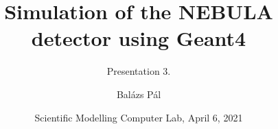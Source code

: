\title[Geant4]
{Simulation of the NEBULA detector using Geant4}

\subtitle{Presentation 3.}

\author[Balázs Pál]
{Balázs Pál}


\date[ELTE 2021]
{Scientific Modelling Computer Lab, April 6, 2021}

